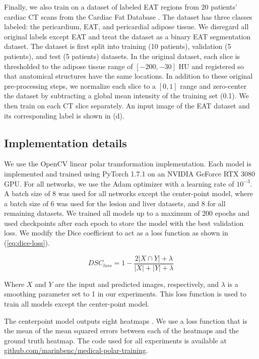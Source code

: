 Finally, we also train on a dataset of labeled EAT regions from 20 patients' cardiac CT scans from 
the Cardiac Fat Database \cite{rodriguesNovelApproachAutomated2016}. The dataset has three classes labeled: 
the pericardium, EAT, and pericardial adipose tissue. We disregard all original labels except EAT and treat the dataset as a binary EAT segmentation dataset. The dataset is 
first split into training (10 patients), validation (5 patients), and test (5 patients) datasets. In the 
original dataset, 
each slice is thresholded to the adipose tissue range of $[-200, -30]$ HU and registered so that anatomical 
structures have the same locations. In addition to these original pre-processing steps, we normalize each 
slice to a $[0, 1]$ range and zero-center 
the dataset by subtracting a global mean intensity of the training set (0.1). We then train on 
each CT slice separately. An input image of the EAT dataset and its corresponding label is shown in 
(d).

    \subsection{Implementation details}

We use the OpenCV linear polar transformation implementation.
Each model is implemented and trained using PyTorch 1.7.1 on an NVIDIA GeForce RTX 3080 GPU. For all 
networks, we use the Adam optimizer with a learning rate of $10^{-3}$. A batch size of 8 was used for all 
networks except the center-point model, where a batch size of 6 was used for the lesion and liver datasets, 
and 8 for all remaining datasets. We trained all models up to a maximum of 200 epochs and used checkpoints 
after each epoch to store the model with the best validation loss. We modify the Dice coefficient to act as a loss function as shown in (\ref{eq:dice-loss}).

  \begin{equation}
    \textit{DSC}_{loss} = 1 - \frac {2\lvert X\cap Y\rvert + \lambda}{\lvert X\rvert + \lvert Y\rvert + \lambda}
    \label{eq:dice-loss}
  \end{equation}
  
Where $X$ and $Y$ are the input and predicted images, respectively, and $\lambda$ is a smoothing parameter set to 1 in our experiments. 
This loss function is used to train all models except the center-point model.

The centerpoint model outputs eight heatmaps \cite{newellStackedHourglassNetworks2016}. 
We use a loss function that is the mean of the mean squared errors between each of the heatmaps and the ground truth heatmap.
The code used for all experiments is available at \url{github.com/marinbenc/medical-polar-training}.

